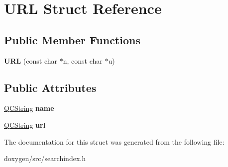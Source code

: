 \hypertarget{struct_u_r_l}{}\section{U\+RL Struct Reference}
\label{struct_u_r_l}
\subsection*{Public Member Functions}
\begin{DoxyCompactItemize}
\item 
\mbox{\label{struct_u_r_l_ad317c4e8955722caf6e355e3211a2f84}} 
{\bfseries U\+RL} (const char $\ast$n, const char $\ast$u)
\end{DoxyCompactItemize}
\subsection*{Public Attributes}
\begin{DoxyCompactItemize}
\item 
\mbox{\label{struct_u_r_l_ab8824448990462ddf08bb88c3a312dd2}} 
\mbox{\hyperlink{class_q_c_string}{Q\+C\+String}} {\bfseries name}
\item 
\mbox{\label{struct_u_r_l_a35202d2b5bac50f6471d23cf6db253cf}} 
\mbox{\hyperlink{class_q_c_string}{Q\+C\+String}} {\bfseries url}
\end{DoxyCompactItemize}


The documentation for this struct was generated from the following file\+:\begin{DoxyCompactItemize}
\item 
doxygen/src/searchindex.\+h\end{DoxyCompactItemize}

